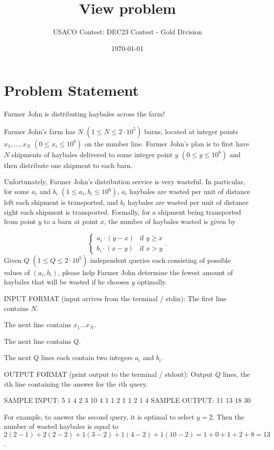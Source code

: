 \documentclass[12pt]{article}
\title{View problem}
\author{USACO Contest: DEC23 Contest - Gold Division}
\date{\today}
\begin{document}
\maketitle

\section*{Problem Statement}


Farmer John is distributing haybales across the farm!

Farmer John's farm has $N$ $(1\le N\le 2\cdot 10^5)$ barns, located at integer
points $x_1,\dots, x_N$ $(0 \le x_i \le 10^6)$ on the number line. Farmer John's
plan is to first have $N$ shipments of haybales delivered to some integer point
$y$ $(0 \le y \le 10^6)$ and then distribute one shipment to each barn.

Unfortunately, Farmer John's distribution service is very wasteful. In
particular, for some $a_i$ and $b_i$ $(1\le a_i, b_i\le 10^6)$, $a_i$ haybales
are wasted per unit of distance left each shipment is transported, and $b_i$
haybales are wasted per unit of distance right each shipment is transported.
Formally, for a shipment being transported from point $y$ to a barn at point
$x$, the number of haybales wasted is given by 

$$\begin{cases}
 a_i\cdot (y-x) & \text{if } y \ge x \\
b_i\cdot (x-y) & \text{if } x > y
\end{cases}.$$
Given $Q$ $(1\le Q\le 2\cdot 10^5)$ independent queries each consisting of
possible values of $(a_i,b_i)$, please help Farmer John determine the fewest
amount of haybales that will be wasted if he chooses $y$ optimally. 

INPUT FORMAT (input arrives from the terminal / stdin):
The first line contains $N$.

The next line contains $x_1\dots x_N$.

The next line contains $Q$.

The next $Q$ lines each contain two integers $a_i$ and $b_i$.

OUTPUT FORMAT (print output to the terminal / stdout):
Output $Q$ lines, the $i$th line containing the answer for the $i$th query.

SAMPLE INPUT:
5
1 4 2 3 10
4
1 1
2 1
1 2
1 4
SAMPLE OUTPUT: 
11
13
18
30

For example, to answer the second query, it is optimal to select $y=2$. Then the
number of wasted haybales is equal to
$2(2-1)+2(2-2)+1(3-2)+1(4-2)+1(10-2)=1+0+1+2+8=13$.
\end{document}
